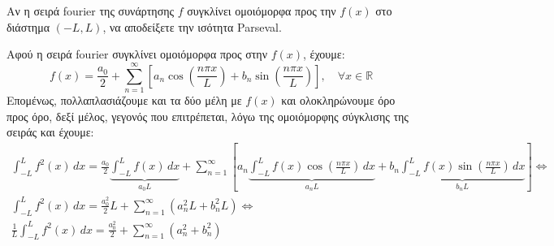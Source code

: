\begin{mybox3}
\begin{example}
  Αν η σειρά fourier της συνάρτησης $f$ συγκλίνει ομοιόμορφα προς την $f(x)$ στο 
  διάστημα $ (-L,L) $, να αποδείξετε την ισότητα Parseval.
\end{example}
\end{mybox3}
\begin{solution}
  Αφού η σειρά fourier συγκλίνει ομοιόμορφα προς στην $ f(x) $, έχουμε:
  \[
    f(x) = \frac{a_{0}}{2} + \sum_{n=1}^{\infty} \left[a_{n} 
    \cos{\left(\frac{n \pi x}{L}\right)} + b_{n} \sin{\left(\frac{n \pi x}{L}\right)}\right], 
    \quad \forall x \in \mathbb{R} 
  \] 
  Επομένως, πολλαπλασιάζουμε και τα δύο μέλη με $ f(x) $ και ολοκληρώνουμε όρο 
  προς όρο, δεξί μέλος, γεγονός που επιτρέπεται, λόγω της ομοιόμορφης σύγκλισης της 
  σειράς και έχουμε:
  \begin{gather*}
    \int _{-L}^{L} f^{2}(x) \,{dx} 
    = \frac{a_{0}}{2} \underbrace{\int _{-L}^{L} f(x) \,{dx}}_{a_{0}L} + 
    \sum_{n=1}^{\infty} \left[a_{n} \underbrace{\int _{-L}^{L} f(x) 
      \cos{\left(\frac{n \pi x}{L}\right)} \,{dx}}_{a_{n}L} + b_{n} 
      \underbrace{\int _{-L}^{L} f(x) \sin{\left(\frac{n \pi x}{L}\right)} 
    \,{dx}}_{b_{n}L} \right] \Leftrightarrow \\ 
    \int _{-L}^{L} f^{2}(x) \,{dx}  = \frac{a_{0}^{2}}{2} L + 
    \sum_{n=1}^{\infty} (a_{n}^{2}L+b_{n}^{2}L) \Leftrightarrow \\
    \frac{1}{L} \int _{-L}^{L} f^{2}(x) \,{dx}  = \frac{a_{0}^{2}}{2}
    + \sum_{n=1}^{\infty} (a_{n}^{2}+b_{n}^{2}) \\
  \end{gather*}
\end{solution}







